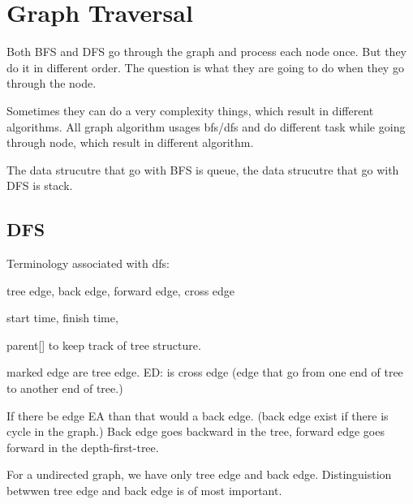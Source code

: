 \section{Graph Traversal}

Both BFS and DFS go through the graph and process each node once. But they do it in different order.
The question is what they are going to do when they go through the node.

Sometimes they can do a very complexity things, which result in different algorithms. All graph algorithm usages bfs/dfs and do different task while going through node, which result in different algorithm.

The data strucutre that go with BFS is queue, the data strucutre that go with DFS is stack.



\subsection{DFS}
Terminology associated with dfs:
\begin{compactenum}
    \item tree edge, back edge, forward edge, cross edge
    \item start time, finish time,
    \item parent[] to keep track of tree structure.
\end{compactenum}
marked edge are tree edge.
ED: is cross edge (edge that go from one end of tree to another end of tree.)

If there be edge EA than that would a back edge. (back edge exist if there is cycle in the graph.) Back edge goes backward in the tree, forward edge goes forward in the depth-first-tree.

For a undirected graph, we have only tree edge and back edge.
Distinguistion betwwen tree edge and back edge is of most important.

